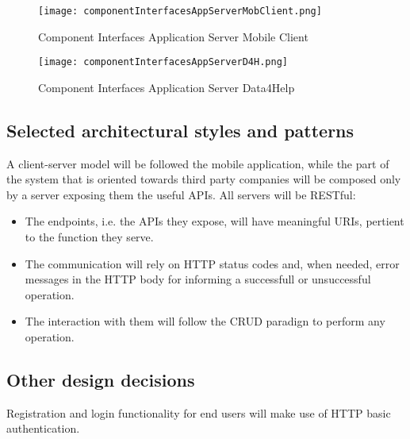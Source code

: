 \documentclass[../main.tex]{subfiles}
\begin{document}
\begin{figure}[H]
        \centering
             \texttt{[image: componentInterfacesAppServerMobClient.png]}
              \caption{Component Interfaces Application Server Mobile Client}
               \label{fig:componentInterfacesAppServerMobClient}
\end{figure}

\vspace*{2cm}

\begin{figure}[H]
        \centering
             \texttt{[image: componentInterfacesAppServerD4H.png]}
              \caption{Component Interfaces Application Server Data4Help }
               \label{fig:componentInterfacesAppServerD4H}
\end{figure}

\vspace*{2cm}


\subsection{Selected architectural styles and patterns}

A client-server model will be followed the mobile application, while the part of the system that is oriented towards third party companies will be composed only by a server exposing them the useful APIs. All servers will be RESTful:
\begin{itemize}
	\item The endpoints, i.e. the APIs they expose, will have meaningful URIs, pertient to the function they serve.
	\item The communication will rely on HTTP status codes and, when needed, error messages in the HTTP body for informing a successfull or unsuccessful operation.
	\item The interaction with them will follow the CRUD paradign to perform any operation.
\end{itemize}


\subsection{Other design decisions}

\begin{description}
	\item Registration and login functionality for end users will make use of HTTP basic authentication.
\end{description}
\end{document}
